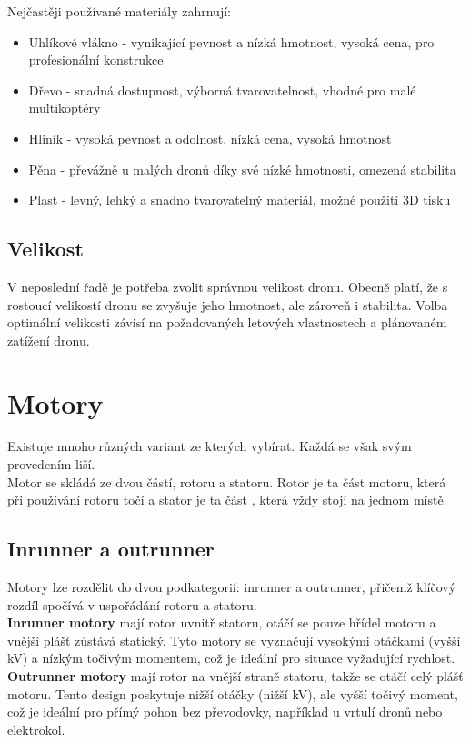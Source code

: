 \documentclass[12pt]{report}
\begin{document}
Nejčastěji používané materiály zahrnují:
\begin{itemize}
	\item Uhlíkové vlákno - vynikající pevnost a nízká hmotnost, vysoká cena, pro profesionální konstrukce
	\item Dřevo - snadná dostupnost, výborná tvarovatelnost, vhodné pro malé multikoptéry
	\item Hliník - vysoká pevnost a odolnost, nízká cena, vysoká hmotnost
	\item Pěna - převážně u malých dronů díky své nízké hmotnosti, omezená stabilita
	\item Plast - levný, lehký a snadno tvarovatelný materiál, možné použití 3D tisku
\end{itemize}

\subsection{Velikost}
V neposlední řadě je potřeba zvolit správnou velikost dronu.  Obecně platí, že s rostoucí velikostí dronu se zvyšuje jeho hmotnost, ale zároveň i stabilita. Volba optimální velikosti závisí na požadovaných letových vlastnostech a plánovaném zatížení dronu. \cite{mainbook} \cite{dojo} \cite{ultimateguide}

\section{Motory}
Existuje mnoho různých variant ze kterých vybírat. Každá se však svým provedením liší.\\
Motor se skládá ze dvou částí, rotoru a statoru. Rotor je ta část motoru, která při používání rotoru točí a stator je ta část , která vždy stojí na jednom místě.


\subsection{Inrunner a outrunner}
Motory lze rozdělit do dvou podkategorií: inrunner a outrunner, přičemž klíčový rozdíl spočívá v uspořádání rotoru a statoru.\\
\textbf{Inrunner motory} mají rotor uvnitř statoru, otáčí se pouze hřídel motoru a vnější plášť zůstává statický. Tyto motory se vyznačují vysokými otáčkami (vyšší kV) a nízkým točivým momentem, což je ideální pro situace vyžadující rychlost.\\
\textbf{Outrunner motory} mají rotor na vnější straně statoru, takže se otáčí celý plášť motoru. Tento design poskytuje nižší otáčky (nižší kV), ale vyšší točivý moment, což je ideální pro přímý pohon bez převodovky, například u vrtulí dronů nebo elektrokol. 
\end{document}
